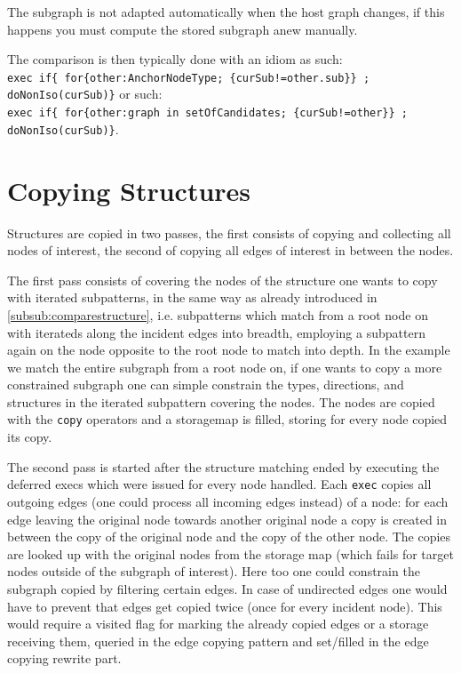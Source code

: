 \begin{warning}
The subgraph is not adapted automatically when the host graph changes, if this happens you must compute the stored subgraph anew manually.
\end{warning}

\noindent The comparison is then typically done with an idiom as such:\\
\verb#exec if{ for{other:AnchorNodeType; {curSub!=other.sub}} ; doNonIso(curSub)}# 
or such:\\
\verb#exec if{ for{other:graph in setOfCandidates; {curSub!=other}} ; doNonIso(curSub)}#.


\section{Copying Structures}\label{subsub:copystructure}
Structures are copied in two passes, the first consists of copying and collecting all nodes of interest, the second of copying all edges of interest in between the nodes.

The first pass consists of covering the nodes of the structure one wants to copy with iterated subpatterns,
in the same way as already introduced in \ref{subsub:comparestructure},
i.e. subpatterns which match from a root node on with iterateds along the incident edges into breadth,
employing a subpattern again on the node opposite to the root node to match into depth.
In the example we match the entire subgraph from a root node on, if one wants to copy a more constrained subgraph one can simple constrain the types, directions, and structures in the iterated subpattern covering the nodes.
The nodes are copied with the \texttt{copy} operators and a storagemap is filled, storing for every node copied its copy.

The second pass is started after the structure matching ended by executing the deferred execs which were issued for every node handled.
Each \texttt{exec} copies all outgoing edges (one could process all incoming edges instead) of a node:
for each edge leaving the original node towards another original node a copy is created in between the copy of the original node and the copy of the other node.
The copies are looked up with the original nodes from the storage map (which fails for target nodes outside of the subgraph of interest).
Here too one could constrain the subgraph copied by filtering certain edges.
In case of undirected edges one would have to prevent that edges get copied twice (once for every incident node). This would require a visited flag for marking the already copied edges or a storage receiving them, queried in the edge copying pattern and set/filled in the edge copying rewrite part.

